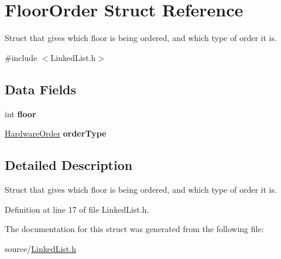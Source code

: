\hypertarget{structFloorOrder}{}\section{Floor\+Order Struct Reference}
\label{structFloorOrder}


Struct that gives which floor is being ordered, and which type of order it is.  




{\ttfamily \#include $<$Linked\+List.\+h$>$}

\subsection*{Data Fields}
\begin{DoxyCompactItemize}
\item 
\mbox{\label{structFloorOrder_a4f27ce4311fbde142eab7f582bf1a9c3}} 
int {\bfseries floor}
\item 
\mbox{\label{structFloorOrder_ad94ddc8286f5aeaca0e49a8ae84d4463}} 
\hyperlink{hardware_8h_a796a8de8ce0ae769d7dbd3327a7bdbe7}{Hardware\+Order} {\bfseries order\+Type}
\end{DoxyCompactItemize}


\subsection{Detailed Description}
Struct that gives which floor is being ordered, and which type of order it is. 

Definition at line 17 of file Linked\+List.\+h.



The documentation for this struct was generated from the following file\+:\begin{DoxyCompactItemize}
\item 
source/\hyperlink{LinkedList_8h}{Linked\+List.\+h}\end{DoxyCompactItemize}
